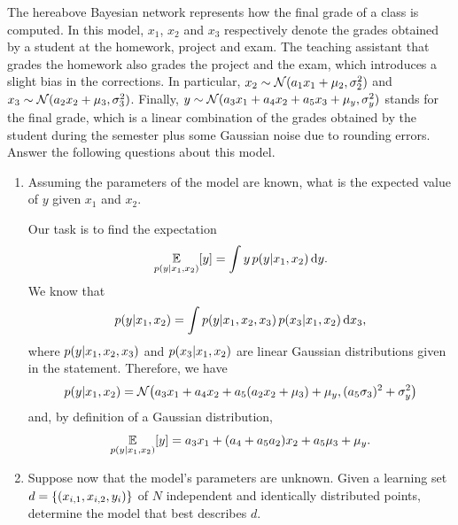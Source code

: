 \documentclass[11pt, a4paper]{article}
\begin{document}
The hereabove Bayesian network represents how the final grade of a class is computed. In this model, $x_1$, $x_2$ and $x_3$ respectively denote the grades obtained by a student at the homework, project and exam. The teaching assistant that grades the homework also grades the project and the exam, which introduces a slight bias in the corrections. In particular, $x_2 \sim \mathcal{N}(a_1 x_1 + \mu_2, \sigma_2^2)$ and $x_3 \sim \mathcal{N}(a_2 x_2 + \mu_3, \sigma_3^2)$. Finally, $y \sim \mathcal{N}(a_3 x_1 + a_4 x_2 + a_5 x_3 + \mu_y, \sigma_y^2)$ stands for the final grade, which is a linear combination of the grades obtained by the student during the semester plus some Gaussian noise due to rounding errors. Answer the following questions about this model.

\begin{enumerate}
    \item Assuming the parameters of the model are known, what is the expected value of $y$ given $x_1$ and $x_2$.
    
    \begin{solution}
        Our task is to find the expectation
        \begin{equation*}
            \underset{p(y \vert x_1, x_2)}{\mathbb{E}} [y] = \int y \, p(y \vert x_1, x_2) \operatorname{d}\!{y} .
        \end{equation*}
        We know that
        \begin{equation*}
            p(y \vert x_1, x_2) = \int p(y \vert x_1, x_2, x_3) \, p(x_3 \vert x_1, x_2) \operatorname{d}\!{x_3} ,
        \end{equation*}
        where $p(y \vert x_1, x_2, x_3)$ and $p(x_3 \vert x_1, x_2)$ are linear Gaussian distributions given in the statement. Therefore, we have
        \begin{equation*}
            p(y \knowing x_1, x_2) = \N\rbk*{a_3 x_1 + a_4 x_2 + a_5 (a_2 x_2 + \mu_3) + \mu_y, (a_5 \sigma_3)^2 + \sigma_y^2}
        \end{equation*}
        and, by definition of a Gaussian distribution,
        \begin{equation*}
            \underset{p(y \vert x_1, x_2)}{\mathbb{E}} [y] = a_3 x_1 + (a_4 + a_5 a_2) x_2 + a_5 \mu_3 + \mu_y.
        \end{equation*}
    \end{solution}
    
    \item \label{itm:mle} Suppose now that the model's parameters are unknown. Given a learning set $d = \{(x_{i,1}, x_{i,2}, y_i)\}$ of $N$ independent and identically distributed points, determine the model that best describes $d$.
    

\end{enumerate}
\end{document}
